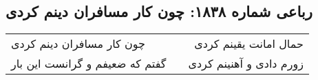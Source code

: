\begin{center}
\section*{رباعی شماره ۱۸۳۸: چون کار مسافران دینم کردی}
\label{sec:1838}
\begin{longtable}{l p{0.5cm} r}
چون کار مسافران دینم کردی
&&
حمال امانت یقینم کردی
\\
گفتم که ضعیفم و گرانست این بار
&&
زورم دادی و آهنینم کردی
\\
\end{longtable}
\end{center}
